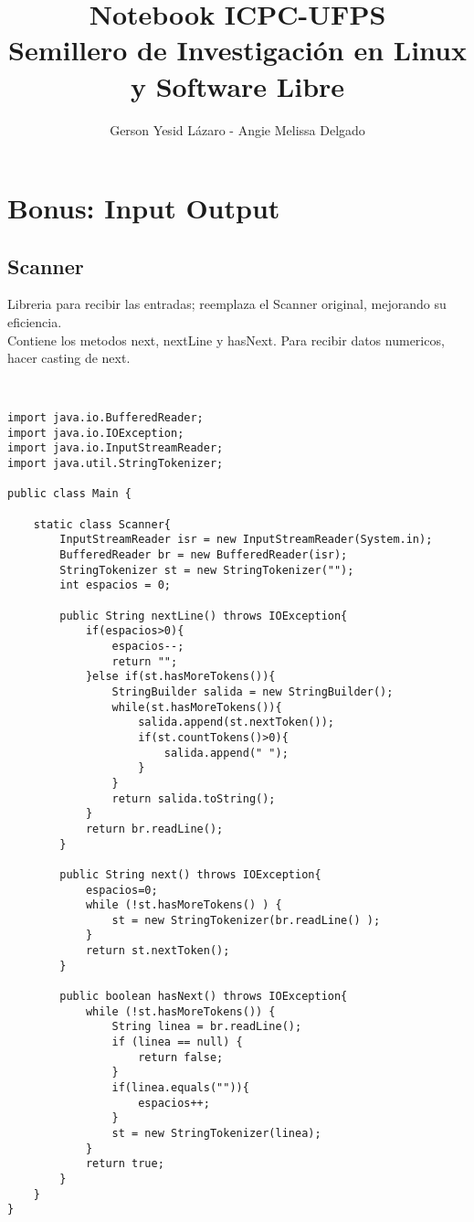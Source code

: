 \documentclass[11pt,letterpaper,twocolumn,twosided]{article}
\begin{document}
\title{Notebook ICPC-UFPS\\Semillero de Investigaci\'on en Linux y Software Libre}
\author{Gerson Yesid L\'azaro - Angie Melissa Delgado}
\maketitle
\tableofcontents
{}


\section{Bonus: Input Output}

\subsection{Scanner}
Libreria para recibir las entradas; reemplaza el Scanner original, mejorando su eficiencia. \\
Contiene los metodos next, nextLine y hasNext. Para recibir datos numericos, hacer casting de next.

\begin{lstlisting}


import java.io.BufferedReader;
import java.io.IOException;
import java.io.InputStreamReader;
import java.util.StringTokenizer;

public class Main {

    static class Scanner{
        InputStreamReader isr = new InputStreamReader(System.in);
        BufferedReader br = new BufferedReader(isr);
        StringTokenizer st = new StringTokenizer("");
        int espacios = 0;

        public String nextLine() throws IOException{
        	if(espacios>0){
            	espacios--;
            	return "";
            }else if(st.hasMoreTokens()){
                StringBuilder salida = new StringBuilder();
                while(st.hasMoreTokens()){
                    salida.append(st.nextToken());
                    if(st.countTokens()>0){
                        salida.append(" ");
                    }
                }
                return salida.toString();
            }
            return br.readLine();
        }

        public String next() throws IOException{
        	espacios=0;
            while (!st.hasMoreTokens() ) {
                st = new StringTokenizer(br.readLine() );
            }
            return st.nextToken();
        }

        public boolean hasNext() throws IOException{
            while (!st.hasMoreTokens()) {
                String linea = br.readLine();
                if (linea == null) {
                    return false;
                }
                if(linea.equals("")){
                	espacios++;
                }
                st = new StringTokenizer(linea);
            }
            return true;
        }
    }
}
\end{lstlisting}
\end{document}
